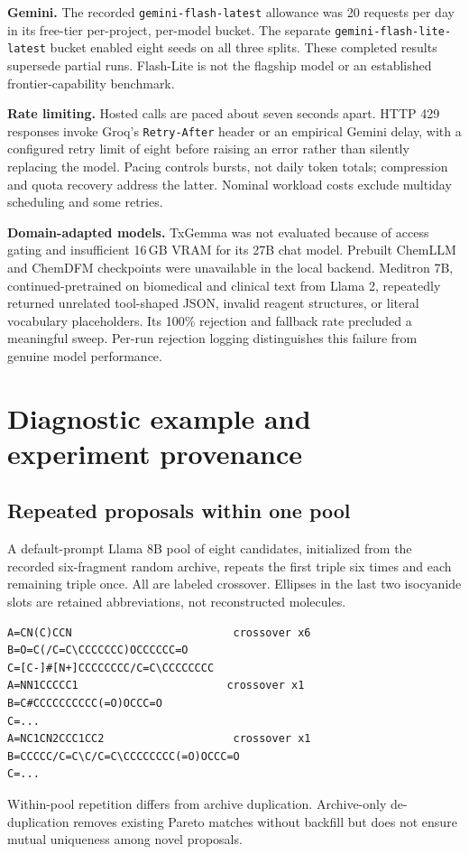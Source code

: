\textbf{Gemini.} The recorded \texttt{gemini-flash-latest} allowance was 20 requests per day in its free-tier per-project, per-model bucket. The separate \texttt{gemini-flash-lite-latest} bucket enabled eight seeds on all three splits. These completed results supersede partial runs. Flash-Lite is not the flagship model or an established frontier-capability benchmark.

\textbf{Rate limiting.} Hosted calls are paced about seven seconds apart. HTTP 429 responses invoke Groq's \texttt{Retry-After} header or an empirical Gemini delay, with a configured retry limit of eight before raising an error rather than silently replacing the model. Pacing controls bursts, not daily token totals; compression and quota recovery address the latter. Nominal workload costs exclude multiday scheduling and some retries.

\textbf{Domain-adapted models.} TxGemma was not evaluated because of access gating and insufficient 16\,GB VRAM for its 27B chat model. Prebuilt ChemLLM and ChemDFM checkpoints were unavailable in the local backend. Meditron 7B, continued-pretrained on biomedical and clinical text from Llama 2, repeatedly returned unrelated tool-shaped JSON, invalid reagent structures, or literal vocabulary placeholders. Its 100\% rejection and fallback rate precluded a meaningful sweep. Per-run rejection logging distinguishes this failure from genuine model performance.

\section{Diagnostic example and experiment provenance}
\label{app:example}
\subsection{Repeated proposals within one pool}
A default-prompt Llama 8B pool of eight candidates, initialized from the recorded six-fragment random archive, repeats the first triple six times and each remaining triple once. All are labeled crossover. Ellipses in the last two isocyanide slots are retained abbreviations, not reconstructed molecules.
\begin{Verbatim}[fontsize=\small,breaklines,breakanywhere]
A=CN(C)CCN                         crossover x6
B=O=C(/C=C\CCCCCCC)OCCCCCC=O
C=[C-]#[N+]CCCCCCCC/C=C\CCCCCCCC
A=NN1CCCCC1                       crossover x1
B=C#CCCCCCCCCC(=O)OCCC=O
C=...
A=NC1CN2CCC1CC2                    crossover x1
B=CCCCC/C=C\C/C=C\CCCCCCCC(=O)OCCC=O
C=...
\end{Verbatim}
Within-pool repetition differs from archive duplication. Archive-only de-duplication removes existing Pareto matches without backfill but does not ensure mutual uniqueness among novel proposals.


